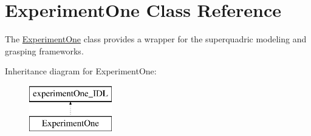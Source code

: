 \section{Experiment\-One Class Reference}
\label{classExperimentOne}


The \hyperlink{classExperimentOne}{Experiment\-One} class provides a wrapper for the superquadric modeling and grasping frameworks.  


Inheritance diagram for Experiment\-One\-:\begin{figure}[H]
\begin{center}
\leavevmode
\includegraphics[height=2.000000cm]{classExperimentOne}
\end{center}
\end{figure}
